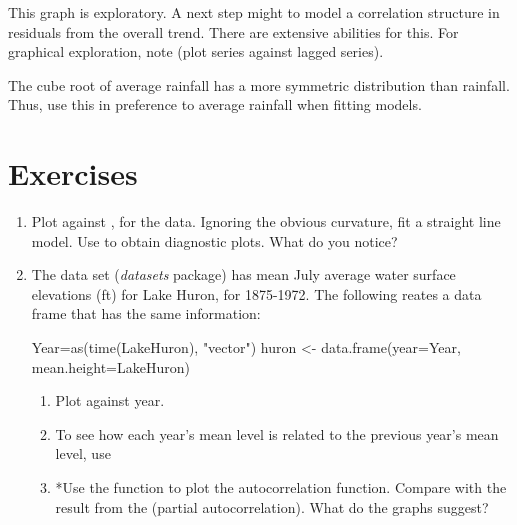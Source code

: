This graph is exploratory.  A next step might to model a
correlation structure in residuals from the overall trend.  There
are extensive abilities for this.  For graphical exploration, note
 (plot series against lagged series).

The cube root of average rainfall has a more symmetric distribution
than rainfall.  Thus, use this in preference to average rainfall when
fitting models.


\section{Exercises}


\begin{enumerate}

\item Plot  against , for the
   data.  Ignoring the obvious curvature, fit a
  straight line model. Use  to obtain diagnostic
  plots.  What do you notice?
\item The data set  (\textit{datasets} package) has
  mean July average water surface elevations (ft) for Lake Huron, for
  1875-1972. The following reates a data frame that has the
  same information:
\begin{Schunk}
\begin{Sinput}
Year=as(time(LakeHuron), "vector")
huron <- data.frame(year=Year, mean.height=LakeHuron)
\end{Sinput}
\end{Schunk}
\begin{enumerate}
\item Plot  against year.

\item To see how each year's mean level is related
to the previous year's mean level, use
\begin{Schunk}
\end{Schunk}

\item *Use the function  to plot the autocorrelation
function.  Compare with the result from the  (partial
autocorrelation).  What do the graphs suggest?
\end{enumerate}
\end{enumerate}
